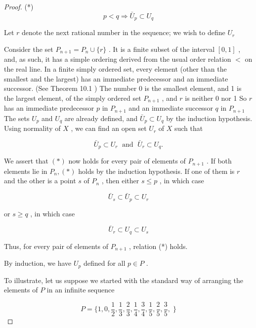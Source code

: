 \begin{proof}
(*)
\[
p < q \Rightarrow  {\bar{U}}_{p} \subset  {U}_{q}
\]

Let \(r\) denote the next rational number in the sequence; we wish to define \({U}_{r}\)

Consider the set \({P}_{n + 1} = {P}_{n} \cup  \{ r\}\) . It is a finite subset of the interval \(\left\lbrack  {0,1}\right\rbrack\) , and, as such, it has a simple ordering derived from the usual order relation \(<\) on the real line. In a finite simply ordered set, every element (other than the smallest and the largest) has an immediate predecessor and an immediate successor. (See Theorem 10.1 ) The number 0 is the smallest element, and 1 is the largest element, of the simply ordered set \({P}_{n + 1}\) , and \(r\) is neither 0 nor 1 So \(r\) has an immediate predecessor \(p\) in \({P}_{n + 1}\) and an immediate successor \(q\) in \({P}_{n + 1}\) The sets \({U}_{p}\) and \({U}_{q}\) are already defined, and \({\bar{U}}_{p} \subset  {U}_{q}\) by the induction hypothesis. Using normality of \(X\) , we can find an open set \({U}_{r}\) of \(X\) such that

\[
{\bar{U}}_{p} \subset  {U}_{r}\;\text{ and }\;{\bar{U}}_{r} \subset  {U}_{q}.
\]

We assert that \(\left( *\right)\) now holds for every pair of elements of \({P}_{n + 1}\) . If both elements lie in \({P}_{n},\left( *\right)\) holds by the induction hypothesis. If one of them is \(r\) and the other is a point \(s\) of \({P}_{n}\) , then either \(s \leq  p\) , in which case

\[
{\bar{U}}_{s} \subset  {\bar{U}}_{p} \subset  {U}_{r}
\]

or \(s \geq  q\) , in which case

\[
{\bar{U}}_{r} \subset  {U}_{q} \subset  {U}_{s}
\]

Thus, for every pair of elements of \({P}_{n + 1}\) , relation (*) holds.


By induction, we have \({U}_{p}\) defined for all \(p \in  P\) .

To illustrate, let us suppose we started with the standard way of arranging the elements of \(P\) in an infinite sequence

\[
P = \{ 1,0,\frac{1}{2},\frac{1}{3},\frac{2}{3},\frac{1}{4},\frac{3}{4},\frac{1}{5},\frac{2}{5},\frac{3}{5},\;\}
\]


\end{proof}
